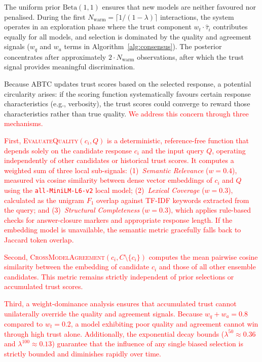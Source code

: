 \documentclass{iopjournal}
\newcommand{\rev}[1]{\textcolor{red}{#1}}
\begin{document}
The uniform prior $\text{Beta}(1,1)$ ensures that new models are neither favoured nor penalised. During the first $N_{\text{warm}} = \lceil 1/(1-\lambda) \rceil$ interactions, the system operates in an exploration phase where the trust component $w_t \cdot \hat{\tau}_i$ contributes equally for all models, and selection is dominated by the quality and agreement signals ($w_q$ and $w_a$ terms in Algorithm~\ref{alg:consensus}). The posterior concentrates after approximately $2 \cdot N_{\text{warm}}$ observations, after which the trust signal provides meaningful discrimination.

Because ABTC updates trust scores based on the selected response, a potential circularity arises: if the scoring function systematically favours certain response characteristics (e.g., verbosity), the trust scores could converge to reward those characteristics rather than true quality. \rev{We address this concern through three mechanisms.}

\rev{First, \textsc{EvaluateQuality}$(c_i, Q)$ is a deterministic, reference-free function that depends solely on the candidate response $c_i$ and the input query $Q$, operating independently of other candidates or historical trust scores. It computes a weighted sum of three local sub-signals: (1)~\emph{Semantic Relevance} ($w=0.4$), measured via cosine similarity between dense vector embeddings of $c_i$ and $Q$ using the \texttt{all-MiniLM-L6-v2} local model; (2)~\emph{Lexical Coverage} ($w=0.3$), calculated as the unigram $F_1$ overlap against TF-IDF keywords extracted from the query; and (3)~\emph{Structural Completeness} ($w=0.3$), which applies rule-based checks for answer-closure markers and appropriate response length. If the embedding model is unavailable, the semantic metric gracefully falls back to Jaccard token overlap.}

\rev{Second, \textsc{CrossModelAgreement}$(c_i, C \setminus \{c_i\})$ computes the mean pairwise cosine similarity between the embedding of candidate $c_i$ and those of all other ensemble candidates. This metric remains strictly independent of prior selections or accumulated trust scores.}

\rev{Third, a weight-dominance analysis ensures that accumulated trust cannot unilaterally override the quality and agreement signals. Because $w_q + w_a = 0.8$ compared to $w_t = 0.2$, a model exhibiting poor quality and agreement cannot win through high trust alone. Additionally, the exponential decay bounds ($\lambda^{50} \approx 0.36$ and $\lambda^{100} \approx 0.13$) guarantee that the influence of any single biased selection is strictly bounded and diminishes rapidly over time.}
\end{document}
